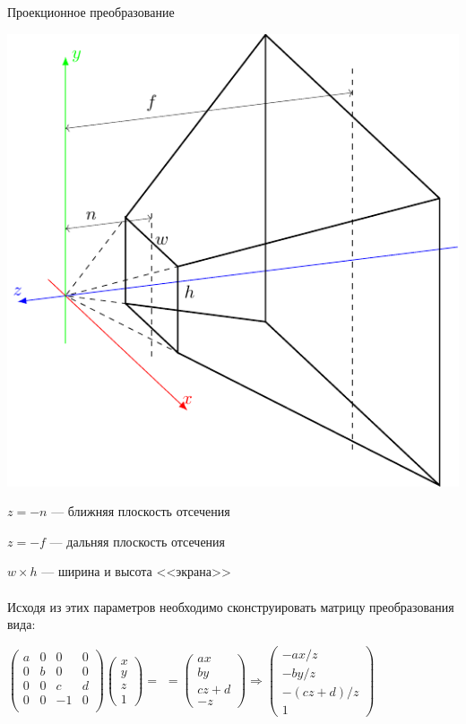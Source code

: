 \documentclass[10pt]{beamer}
\begin{document}
\begin{frame}{Проекционное преобразование}
		
		
		
	\end{frame}
	
	
	\begin{frame} 
		{
			\includegraphics[width=\textwidth, page=1]{cvv.pdf}
		}
		{
		$z=-n$ --- ближняя плоскость отсечения
		
		$z=-f$ --- дальняя плоскость отсечения
		
		$w\times h$ --- ширина и высота <<экрана>> \\ ~ \\
		
		
		Исходя из этих параметров необходимо сконструировать матрицу преобразования вида:
		
		$ 
		\begin{pmatrix}
			a& 0& 0& 0 \\
			0 &b &0 &0 \\
			0 &0& c& d\\
			0& 0& -1& 0\\
		\end{pmatrix}
		\begin{pmatrix}
			x\\
			y\\
			z\\
			1
		\end{pmatrix}
		=
		$
		$
		=
		\begin{pmatrix}
			ax\\
			by\\
			cz+d\\
			-z
		\end{pmatrix}
		\Rightarrow
		\begin{pmatrix}
			-ax/z\\
			-by/z\\
			-(cz+d)/z\\
			1
		\end{pmatrix}
		$
		}
	\end{frame}
	
\end{document}
